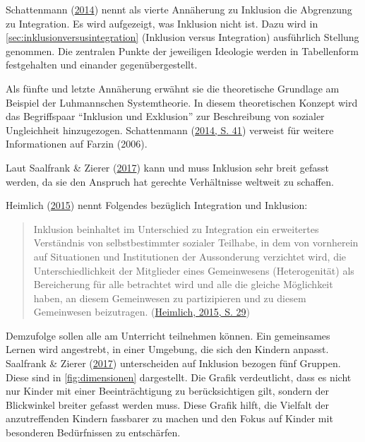 \documentclass[
  ngerman,
  11pt,
  paper=a4,
  twoside,
  titlepage=true,
  openright,
  abstract=on,
  toc=listofnumbered,
  numbers=noenddot,
  chapterprefix=true,
  headings=optiontohead,
  svgnames,
  dvipsnames]{scrreprt}
\begin{document}
Schattenmann (\protect\hyperlink{ref-schattenmann_inklusion_2014}{2014})
nennt als vierte Annäherung zu Inklusion die Abgrenzung zu Integration.
Es wird aufgezeigt, was Inklusion nicht ist. Dazu wird in
\cref{sec:inklusionversusintegration} (Inklusion versus Integration)
ausführlich Stellung genommen. Die zentralen Punkte der jeweiligen
Ideologie werden in Tabellenform festgehalten und einander
gegenübergestellt.

Als fünfte und letzte Annäherung erwähnt sie die theoretische Grundlage
am Beispiel der Luhmannschen Systemtheorie. In diesem theoretischen
Konzept wird das Begriffspaar “Inklusion und Exklusion” zur Beschreibung
von sozialer Ungleichheit hinzugezogen. Schattenmann
(\protect\hyperlink{ref-schattenmann_inklusion_2014}{2014, S. 41})
verweist für weitere Informationen auf Farzin (2006).

Laut Saalfrank \& Zierer
(\protect\hyperlink{ref-saalfrank_inklusion_2017}{2017}) kann und muss
Inklusion sehr breit gefasst werden, da sie den Anspruch hat gerechte
Verhältnisse weltweit zu schaffen.

Heimlich (\protect\hyperlink{ref-inklusionQualituxe4t_Heimlich}{2015})
nennt Folgendes bezüglich Integration und Inklusion:

\begin{quote}
Inklusion beinhaltet im Unterschied zu Integration ein erweitertes
Verständnis von selbstbestimmter sozialer Teilhabe, in dem von
vornherein auf Situationen und Institutionen der Aussonderung verzichtet
wird, die Unterschiedlichkeit der Mitglieder eines Gemeinwesens
(Heterogenität) als Bereicherung für alle betrachtet wird und alle die
gleiche Möglichkeit haben, an diesem Gemeinwesen zu partizipieren und zu
diesem Gemeinwesen beizutragen.
(\protect\hyperlink{ref-inklusionQualituxe4t_Heimlich}{Heimlich, 2015,
S. 29})
\end{quote}

Demzufolge sollen alle am Unterricht teilnehmen können. Ein gemeinsames
Lernen wird angestrebt, in einer Umgebung, die sich den Kindern anpasst.
Saalfrank \& Zierer
(\protect\hyperlink{ref-saalfrank_inklusion_2017}{2017}) unterscheiden
auf Inklusion bezogen fünf Gruppen. Diese sind in \cref{fig:dimensionen}
dargestellt. Die Grafik verdeutlicht, dass es nicht nur Kinder mit einer
Beeinträchtigung zu berücksichtigen gilt, sondern der Blickwinkel
breiter gefasst werden muss. Diese Grafik hilft, die Vielfalt der
anzutreffenden Kindern fassbarer zu machen und den Fokus auf Kinder mit
besonderen Bedürfnissen zu entschärfen.
\end{document}
